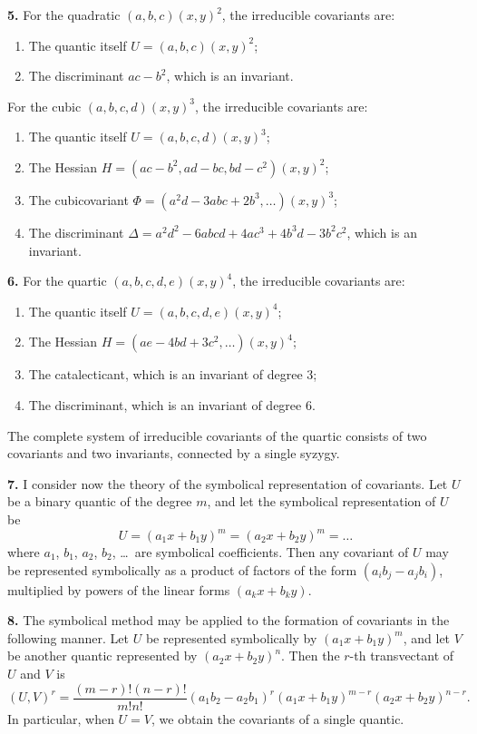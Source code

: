 \documentclass[11pt,a4paper]{book}
\begin{document}
\textbf{5.} For the quadratic $(a, b, c)(x, y)^2$, the irreducible covariants are:
\begin{enumerate}
\item The quantic itself $U = (a, b, c)(x, y)^2$;
\item The discriminant $ac - b^2$, which is an invariant.
\end{enumerate}

\newpage
\setcounter{page}{248}

For the cubic $(a, b, c, d)(x, y)^3$, the irreducible covariants are:
\begin{enumerate}
\item The quantic itself $U = (a, b, c, d)(x, y)^3$;
\item The Hessian $H = (ac-b^2, ad-bc, bd-c^2)(x, y)^2$;
\item The cubicovariant $\Phi = (a^2d - 3abc + 2b^3, \ldots)(x, y)^3$;
\item The discriminant $\Delta = a^2d^2 - 6abcd + 4ac^3 + 4b^3d - 3b^2c^2$, which is an invariant.
\end{enumerate}

\textbf{6.} For the quartic $(a, b, c, d, e)(x, y)^4$, the irreducible covariants are:
\begin{enumerate}
\item The quantic itself $U = (a, b, c, d, e)(x, y)^4$;
\item The Hessian $H = (ae - 4bd + 3c^2, \ldots)(x, y)^4$;
\item The catalecticant, which is an invariant of degree 3;
\item The discriminant, which is an invariant of degree 6.
\end{enumerate}
The complete system of irreducible covariants of the quartic consists of two covariants and two invariants, connected by a single syzygy.

\newpage
\setcounter{page}{249}

\textbf{7.} I consider now the theory of the symbolical representation of covariants. Let $U$ be a binary quantic of the degree $m$, and let the symbolical representation of $U$ be
\[
U = (a_1 x + b_1 y)^m = (a_2 x + b_2 y)^m = \ldots
\]
where $a_1$, $b_1$, $a_2$, $b_2$, \ldots\ are symbolical coefficients. Then any covariant of $U$ may be represented symbolically as a product of factors of the form $(a_i b_j - a_j b_i)$, multiplied by powers of the linear forms $(a_k x + b_k y)$.

\textbf{8.} The symbolical method may be applied to the formation of covariants in the following manner. Let $U$ be represented symbolically by $(a_1 x + b_1 y)^m$, and let $V$ be another quantic represented by $(a_2 x + b_2 y)^n$. Then the $r$-th transvectant of $U$ and $V$ is
\[
(U, V)^r = \frac{(m-r)!(n-r)!}{m!n!} (a_1 b_2 - a_2 b_1)^r (a_1 x + b_1 y)^{m-r} (a_2 x + b_2 y)^{n-r}.
\]
In particular, when $U = V$, we obtain the covariants of a single quantic.
\end{document}
